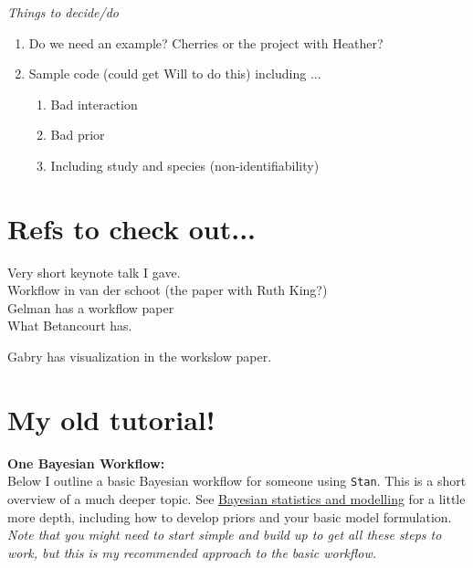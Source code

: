\documentclass[11pt]{article}
\begin{document}
\emph{Things to decide/do}
\begin{enumerate}
\item Do we need an example? Cherries or the project with Heather?
\item Sample code (could get Will to do this) including ... 
\begin{enumerate}
\item Bad interaction
\item Bad prior
\item Including study and species (non-identifiability)
\end{enumerate}
\end{enumerate}


\section{Refs to check out...}

Very short keynote talk I gave. \\ %

Workflow in van der schoot (the paper with Ruth King?)\\
Gelman has a workflow paper \\

What Betancourt has.

Gabry has visualization in the workslow paper. 

\newpage
\section{My old tutorial!} %
{\bf One Bayesian Workflow:} \\

Below I outline a basic Bayesian workflow for someone using \verb|Stan|. This is a short overview of a much deeper topic. See \href{https://www.nature.com/articles/s43586-020-00001-2}{Bayesian statistics and modelling} for a little more depth, including how to develop priors and your basic model formulation.\\

\emph{Note that you might need to start simple and build up to get all these steps to work, but this is my recommended approach to the basic workflow.}
\end{document}
